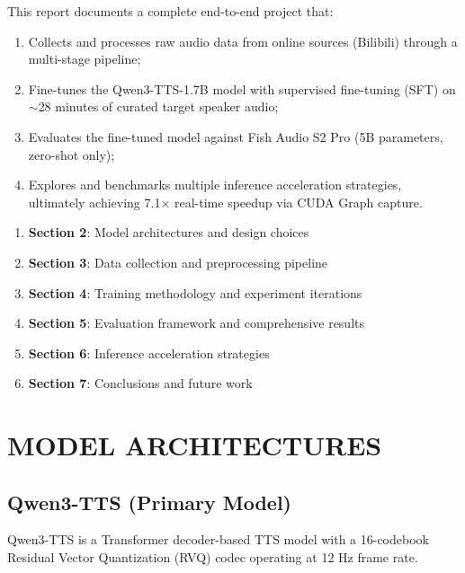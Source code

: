 \documentclass{ar-1col}
\begin{document}
This report documents a complete end-to-end project that:
\begin{enumerate}
    \item Collects and processes raw audio data from online sources (Bilibili) through a multi-stage pipeline;
    \item Fine-tunes the Qwen3-TTS-1.7B model with supervised fine-tuning (SFT) on $\sim$28 minutes of curated target speaker audio;
    \item Evaluates the fine-tuned model against Fish Audio S2 Pro (5B parameters, zero-shot only);
    \item Explores and benchmarks multiple inference acceleration strategies, ultimately achieving 7.1$\times$ real-time speedup via CUDA Graph capture.
\end{enumerate}

\begin{issues}
\begin{enumerate}
    \item \textbf{Section 2}: Model architectures and design choices
    \item \textbf{Section 3}: Data collection and preprocessing pipeline
    \item \textbf{Section 4}: Training methodology and experiment iterations
    \item \textbf{Section 5}: Evaluation framework and comprehensive results
    \item \textbf{Section 6}: Inference acceleration strategies
    \item \textbf{Section 7}: Conclusions and future work
\end{enumerate}
\end{issues}


\section{MODEL ARCHITECTURES}

\subsection{Qwen3-TTS (Primary Model)}

Qwen3-TTS is a Transformer decoder-based TTS model with a 16-codebook Residual Vector Quantization (RVQ) codec operating at 12 Hz frame rate.
\end{document}
